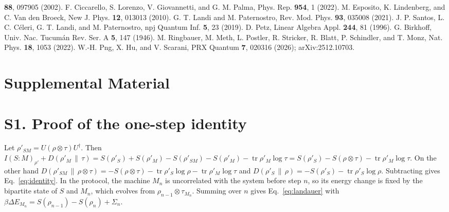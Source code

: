 \documentclass[aps,prl,reprint,superscriptaddress,amsmath,amssymb]{revtex4-2}
\newcommand{\Tr}{\operatorname{tr}}
\newcommand{\Dr}[2]{D(#1\,\|\,#2)}
\begin{document}
\begin{thebibliography}{99}
\textbf{88}, 097905 (2002).
 F. Ciccarello, S. Lorenzo, V. Giovannetti, and G. M. Palma, Phys. Rep. \textbf{954}, 1 (2022).
 M. Esposito, K. Lindenberg, and C. Van den Broeck, New J. Phys. \textbf{12}, 013013 (2010).
 G. T. Landi and M. Paternostro, Rev. Mod. Phys. \textbf{93}, 035008 (2021).
 J. P. Santos, L. C. C\'eleri, G. T. Landi, and M. Paternostro, npj Quantum Inf. \textbf{5}, 23
(2019).
 D. Petz, Linear Algebra Appl. \textbf{244}, 81 (1996).
 G. Birkhoff, Univ. Nac. Tucum\'an Rev. Ser. A \textbf{5}, 147 (1946).
 M. Ringbauer, M. Meth, L. Postler, R. Stricker, R. Blatt, P. Schindler, and T. Monz, Nat. Phys.
\textbf{18}, 1053 (2022).
 W.-H. Png, X. Hu, and V. Scarani, PRX Quantum \textbf{7}, 020316 (2026); arXiv:2512.10703.
\end{thebibliography}

\clearpage
\onecolumngrid
\appendix
\section*{Supplemental Material}

\section{S1. Proof of the one-step identity}
Let $\rho'_{SM}=U(\rho\otimes\tau)U^\dagger$. Then $I(S\!:\!M)_{\rho'}+\Dr{\rho'_M}{\tau}
=S(\rho'_S)+S(\rho'_M)-S(\rho'_{SM})-S(\rho'_M)-\Tr\rho'_M\log\tau = S(\rho'_S)-S(\rho\otimes\tau)-\Tr\rho'_M\log\tau$.
On the other hand $\Dr{\rho'_{SM}}{\rho\otimes\tau}=-S(\rho\otimes\tau)-\Tr\rho'_S\log\rho-\Tr\rho'_M\log\tau$ and
$\Dr{\rho'_S}{\rho}=-S(\rho'_S)-\Tr\rho'_S\log\rho$. Subtracting gives Eq.~\eqref{eq:identity}. In the protocol, the
machine $M_n$ is uncorrelated with the system before step $n$, so its energy change is fixed by the bipartite state of
$S$ and $M_n$, which evolves from $\rho_{n-1}\otimes\tau_{M_n}$. Summing over $n$ gives Eq.~\eqref{eq:landauer} with
$\beta\Delta E_{M_n}=S(\rho_{n-1})-S(\rho_n)+\Sigma_n$.
\end{document}
